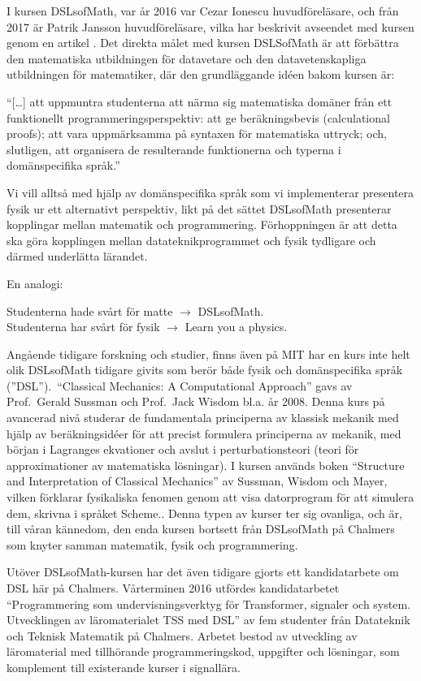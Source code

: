 \begin{draft}
I kursen DSLsofMath, var år 2016 var Cezar Ionescu huvudföreläsare, och från 2017 är Patrik Jansson
huvudföreläsare, vilka har beskrivit avseendet med kursen genom en artikel \cite{tfpie2015}. Det direkta målet 
med kursen DSLSofMath är att förbättra den matematiska utbildningen för datavetare och den
datavetenskapliga utbildningen för matematiker, där den grundläggande idéen bakom kursen är: 

\begin{center}
  ``[\dots] att uppmuntra studenterna att närma sig matematiska domäner från ett
  funktionellt programmeringsperspektiv: att ge beräkningsbevis (calculational
  proofs); att vara uppmärksamma på syntaxen för matematiska uttryck; och,
  slutligen, att organisera de resulterande funktionerna och typerna i
  domänspecifika språk.''\cite{lecture-notes}\cite{tfpie2015} 
\end{center}

Vi vill alltså med hjälp av domänspecifika språk som vi implementerar presentera fysik ur ett alternativt perspektiv, likt
på det sättet DSLsofMath presenterar kopplingar mellan matematik och programmering. Förhoppningen är att detta ska göra kopplingen mellan datateknikprogrammet och fysik tydligare och därmed underlätta lärandet.


En analogi:

Studenterna hade svårt för matte $\rightarrow $ DSLsofMath.\\
Studenterna har svårt för fysik $\rightarrow $ Learn you a physics.


Angående tidigare forskning och studier, finns även på MIT har en kurs inte helt olik DSLsofMath tidigare givits som berör både
fysik och domänspecifika språk (''DSL'').\ ``Classical Mechanics: A Computational Approach'' gavs av
Prof.\ Gerald Sussman och Prof.\ Jack Wisdom bl.a. år
2008.\cite{classical-mechanics-course-mit-2008}
Denna kurs på avancerad nivå studerar de fundamentala principerna av klassisk
mekanik med hjälp av beräkningsidéer för att precist formulera principerna av
mekanik, med början i Lagranges ekvationer och avslut i
perturbationsteori (teori för approximationer av matematiska lösningar). I kursen används boken ``Structure and %
Interpretation of Classical Mechanics'' av Sussman, Wisdom och Mayer,
vilken förklarar fysikaliska fenomen genom att visa datorprogram för att
simulera dem, skrivna i språket Scheme.\cite{SICM}. Denna typen av kurser ter sig ovanliga, och är, till våran kännedom, den enda kursen bortsett från DSLsofMath på Chalmers som knyter samman matematik, fysik och programmering.

Utöver DSLsofMath-kursen har det även tidigare gjorts ett kandidatarbete om DSL 
här på Chalmers. Vårterminen 2016 utfördes kandidatarbetet
``Programmering som undervisningsverktyg för Transformer, signaler och
system. Utvecklingen av läromaterialet TSS med DSL'' av fem studenter
från Datateknik och Teknisk Matematik på Chalmers. Arbetet bestod av
utveckling av läromaterial med tillhörande programmeringskod,
uppgifter och lösningar, som komplement till existerande kurser i
signallära.\cite{kandidat2016}
\end{draft}

